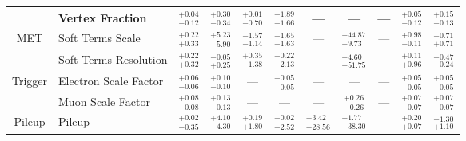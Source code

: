 \begin{tabular}{|cl||ccccccc|c||c|}
\cline{2-11}
&Vertex Fraction &  $^{+0.04}_{-0.12}$  &  $^{+0.30}_{-0.34}$  &  $^{+0.01}_{-0.70}$  &  $^{+1.89}_{-1.66}$  & --- & --- & --- &  $^{+0.05}_{-0.12}$  &  $^{+0.15}_{-0.13}$ \\ 
\hline
\multirow{2}{*}{MET}
&Soft Terms Scale &  $^{+0.22}_{+0.33}$  &  $^{+5.23}_{-5.90}$  &  $^{-1.57}_{-1.14}$  &  $^{-1.65}_{-1.63}$  & --- &  $^{+44.87}_{-9.73}$  & --- &  $^{+0.98}_{-0.11}$  &  $^{-0.71}_{+0.71}$ \\ 
\cline{2-11}
&Soft Terms Resolution &  $^{+0.22}_{+0.32}$  &  $^{-0.05}_{+0.25}$  &  $^{+0.35}_{-1.38}$  &  $^{+0.22}_{-2.13}$  & --- &  $^{-4.60}_{+51.75}$  & --- &  $^{+0.11}_{+0.96}$  &  $^{-0.47}_{-0.24}$ \\ 
\hline
\multirow{2}{*}{Trigger}
&Electron Scale Factor &  $^{+0.06}_{-0.06}$  &  $^{+0.10}_{-0.10}$  & --- &  $^{+0.05}_{-0.05}$  & --- & --- & --- &  $^{+0.05}_{-0.05}$  &  $^{+0.05}_{-0.05}$ \\ 
\cline{2-11}
&Muon Scale Factor &  $^{+0.08}_{-0.08}$  &  $^{+0.13}_{-0.13}$  & --- & --- & --- &  $^{+0.26}_{-0.26}$  & --- &  $^{+0.07}_{-0.07}$  &  $^{+0.07}_{-0.07}$ \\ 
\hline
\multirow{1}{*}{Pileup}
&Pileup &  $^{+0.02}_{-0.35}$  &  $^{+4.10}_{-4.30}$  &  $^{+0.19}_{+1.80}$  &  $^{+0.02}_{-2.52}$  &  $^{+3.42}_{-28.56}$  &  $^{+1.77}_{+38.30}$  & --- &  $^{+0.20}_{+0.07}$  &  $^{-1.30}_{+1.10}$ \\ 
\hline
\end{tabular}
